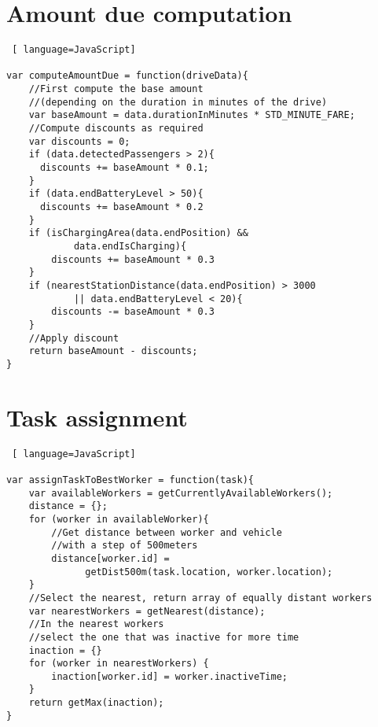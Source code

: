 \section{Amount due computation}

\begin{lstlisting} [ language=JavaScript]

var computeAmountDue = function(driveData){
    //First compute the base amount 
    //(depending on the duration in minutes of the drive)
    var baseAmount = data.durationInMinutes * STD_MINUTE_FARE;
    //Compute discounts as required
    var discounts = 0;
    if (data.detectedPassengers > 2){
      discounts += baseAmount * 0.1;
    }
    if (data.endBatteryLevel > 50){
      discounts += baseAmount * 0.2
    }
    if (isChargingArea(data.endPosition) && 
    		data.endIsCharging){
        discounts += baseAmount * 0.3
    }
    if (nearestStationDistance(data.endPosition) > 3000 
    		|| data.endBatteryLevel < 20){
        discounts -= baseAmount * 0.3
    }
    //Apply discount
    return baseAmount - discounts;
}

\end{lstlisting}

\section{Task assignment}

\begin{lstlisting} [ language=JavaScript]

var assignTaskToBestWorker = function(task){
    var availableWorkers = getCurrentlyAvailableWorkers();
    distance = {};
    for (worker in availableWorker){
        //Get distance between worker and vehicle 
        //with a step of 500meters
        distance[worker.id] = 
        	  getDist500m(task.location, worker.location);
    }
    //Select the nearest, return array of equally distant workers
    var nearestWorkers = getNearest(distance);
    //In the nearest workers
    //select the one that was inactive for more time
    inaction = {}
    for (worker in nearestWorkers) {
        inaction[worker.id] = worker.inactiveTime;
    }
    return getMax(inaction);
}

\end{lstlisting}

